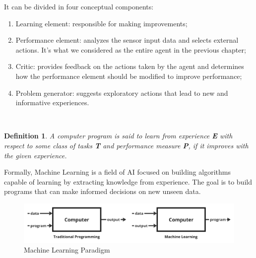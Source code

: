 \documentclass{article}
\newtheorem{definition}{Definition}
\begin{document}
It can be divided in four conceptual components:
\begin{enumerate}
    \item Learning element: responsible for making improvements;
    \item Performance element: analyzes the sensor input data and selects external actions. It's what we considered as the entire agent in the previous chapter;
    \item Critic: provides feedback on the actions taken by the agent and determines how the performance element should be modified to improve performance;
    \item Problem generator: suggests exploratory actions that lead to new and informative experiences. 
\end{enumerate}
\
\begin{definition}
    A computer program is said to learn from experience \textbf{E} with respect to some class of tasks \textbf{T} and performance measure \textbf{P}, if it improves with the given experience.
\end{definition}

Formally, Machine Learning is a field of AI focused on building algorithms capable of learning by extracting knowledge from experience. The goal is to build programs that can make informed decisions on new unseen data.

\begin{figure}[h]
    \centering
    \includegraphics[width=0.75\linewidth]{images/Machine Learning Paradigm.jpg}
    \caption{Machine Learning Paradigm}
    \label{fig:machine_learning_paradigm}
\end{figure}
\end{document}
